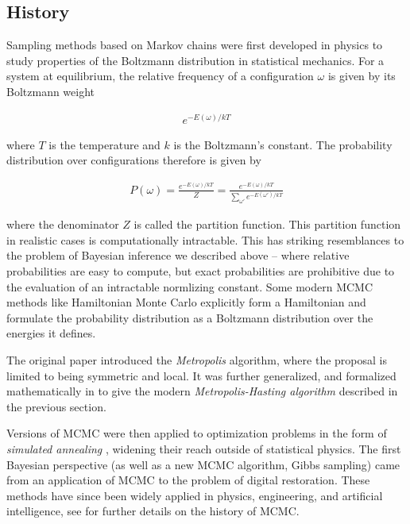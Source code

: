 \subsection{History}
Sampling methods based on Markov chains were first developed in physics to study properties of the Boltzmann distribution in statistical mechanics. \cite{metropolis1953equation} For a system at equilibrium, the relative frequency of a configuration $\omega$ is given by its Boltzmann weight

\begin{align}
e ^{-E(\omega) / kT}
\end{align}

where $T$ is the temperature and $k$ is the Boltzmann's constant. The probability distribution over configurations therefore is given by 

\begin{align}
P(\omega) = \frac{ e ^{-E(\omega) / kT}} {Z} = \frac{ e ^{-E(\omega) / kT}} {\sum_{\omega'} e ^{-E(\omega') / kT}}
\label{eq:Boltzmann}
\end{align}

where the denominator $Z$ is called the partition function. This partition function in realistic cases is computationally intractable. This has striking resemblances to the problem of Bayesian inference we described above -- where relative probabilities are easy to compute, but exact probabilities are prohibitive due to the evaluation of an intractable normlizing constant. Some modern MCMC methods like Hamiltonian Monte Carlo\citep{neal1993probabilistic} explicitly form a Hamiltonian and formulate the probability distribution as a Boltzmann distribution over the energies it defines.

The original paper \citet{metropolis1953equation} introduced the \textit{Metropolis} algorithm, where the proposal is limited to being symmetric and local. It was further generalized, and formalized mathematically in \citet{hastings1970monte} to give the modern \textit{Metropolis-Hasting algorithm} described in the previous section.

Versions of MCMC were then applied to optimization problems in the form of \textit{simulated annealing} \cite{kirkpatrick1983optimization}, widening their reach outside of statistical physics. The first Bayesian perspective (as well as a new MCMC algorithm, Gibbs sampling) came from an application of MCMC to the problem of digital restoration\cite{geman1984stochastic}. These methods have since been widely applied in physics, engineering, and artificial intelligence, see \citet{richey2010evolution} for further details on the history of MCMC.


